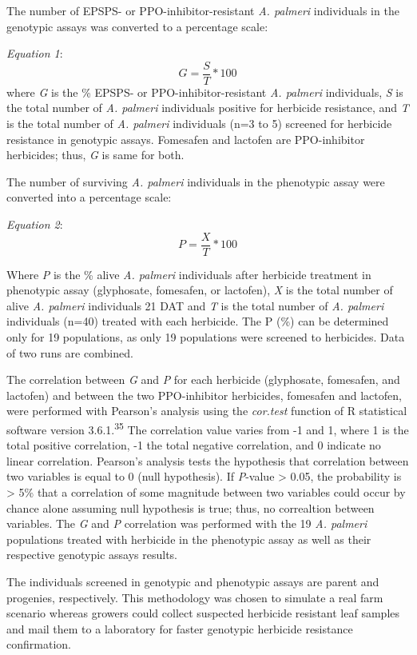 \documentclass[
  12pt,
  a4paper]{article}
\begin{document}
The number of EPSPS- or PPO-inhibitor-resistant \emph{A. palmeri}
individuals in the genotypic assays was converted to a percentage scale:

\emph{Equation 1}: \[G=\frac{S}{T} * 100 \] \noindent where \emph{G} is
the \% EPSPS- or PPO-inhibitor-resistant \emph{A. palmeri} individuals,
\emph{S} is the total number of \emph{A. palmeri} individuals positive
for herbicide resistance, and \emph{T} is the total number of \emph{A.
palmeri} individuals (n=3 to 5) screened for herbicide resistance in
genotypic assays. Fomesafen and lactofen are PPO-inhibitor herbicides;
thus, \emph{G} is same for both.

The number of surviving \emph{A. palmeri} individuals in the phenotypic
assay were converted into a percentage scale:

\emph{Equation 2}: \[P=\frac{X}{T} * 100 \]

Where \emph{P} is the \% alive \emph{A. palmeri} individuals after
herbicide treatment in phenotypic assay (glyphosate, fomesafen, or
lactofen), \emph{X} is the total number of alive \emph{A. palmeri}
individuals 21 DAT and \emph{T} is the total number of \emph{A. palmeri}
individuals (n=40) treated with each herbicide. The P (\%) can be
determined only for 19 populations, as only 19 populations were screened
to herbicides. Data of two runs are combined.

The correlation between \emph{G} and \emph{P} for each herbicide
(glyphosate, fomesafen, and lactofen) and between the two PPO-inhibitor
herbicides, fomesafen and lactofen, were performed with Pearson's
analysis using the \emph{cor.test} function of R statistical software
version 3.6.1.\textsuperscript{35} The correlation value varies from -1
and 1, where 1 is the total positive correlation, -1 the total negative
correlation, and 0 indicate no linear correlation. Pearson's analysis
tests the hypothesis that correlation between two variables is equal to
0 (null hypothesis). If \emph{P}-value \textgreater{} 0.05, the
probability is \textgreater{} 5\% that a correlation of some magnitude
between two variables could occur by chance alone assuming null
hypothesis is true; thus, no correaltion between variables. The \emph{G}
and \emph{P} correlation was performed with the 19 \emph{A. palmeri}
populations treated with herbicide in the phenotypic assay as well as
their respective genotypic assays results.

The individuals screened in genotypic and phenotypic assays are parent
and progenies, respectively. This methodology was chosen to simulate a
real farm scenario whereas growers could collect suspected herbicide
resistant leaf samples and mail them to a laboratory for faster
genotypic herbicide resistance confirmation.
\end{document}
